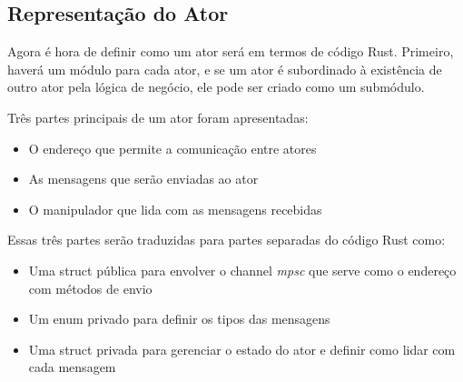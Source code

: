 \subsection{Representação do Ator}

Agora é hora de definir como um ator será em termos de código Rust. Primeiro, haverá um módulo para cada ator, e se um ator é subordinado à existência de outro ator pela lógica de negócio, ele pode ser criado como um submódulo.

Três partes principais de um ator foram apresentadas:

\begin{itemize}
    \item O endereço que permite a comunicação entre atores
    \item As mensagens que serão enviadas ao ator
    \item O manipulador que lida com as mensagens recebidas
\end{itemize}

Essas três partes serão traduzidas para partes separadas do código Rust como:

\begin{itemize}
    \item Uma struct pública para envolver o channel \emph{mpsc} que serve como o endereço com métodos de envio
    \item Um enum privado para definir os tipos das mensagens
    \item Uma struct privada para gerenciar o estado do ator e definir como lidar com cada mensagem
\end{itemize}

